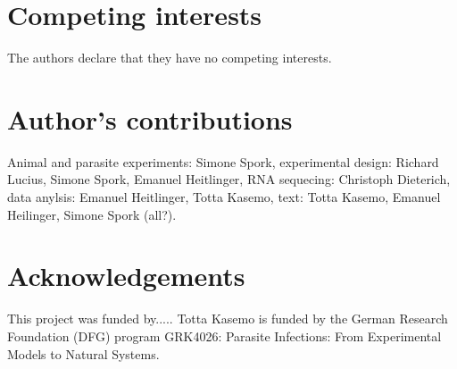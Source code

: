 \documentclass{bmcart}
\begin{document}
\begin{backmatter}

\section*{Competing interests}
  The authors declare that they have no competing interests.

\section*{Author's contributions}
Animal and parasite experiments: Simone Spork, experimental design: Richard Lucius, Simone Spork, Emanuel Heitlinger, RNA sequecing: Christoph Dieterich, data anylsis: Emanuel Heitlinger, Totta Kasemo, text: Totta Kasemo, Emanuel Heilinger, Simone Spork (all?).

\section*{Acknowledgements}
This project was funded by..... Totta Kasemo is funded by the German Research Foundation (DFG) program GRK4026: Parasite Infections: From Experimental Models to Natural Systems. 



\end{backmatter}
\end{document}
